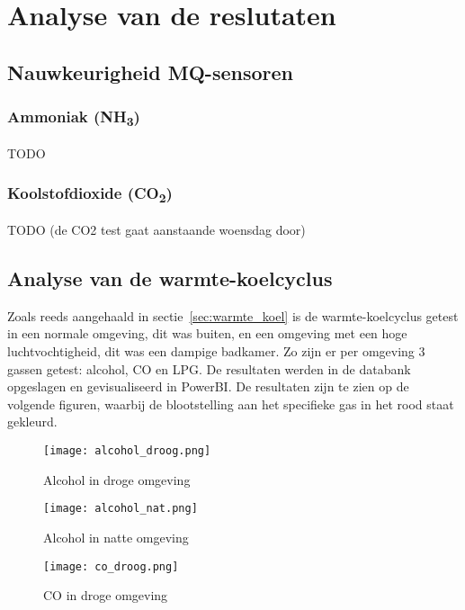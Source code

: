 \chapter{Analyse van de reslutaten}%
\label{ch:analyse}

\section{Nauwkeurigheid MQ-sensoren}
\label{sec:nauwkeurigheid}

\subsection{Ammoniak (NH\textsubscript{3})}
\label{subsec:nh3}

TODO


\subsection{Koolstofdioxide (CO\textsubscript{2})}
\label{subsec:co2}

TODO (de CO2 test gaat aanstaande woensdag door)

\section{Analyse van de warmte-koelcyclus}
\label{sec:analyse_mq7}

Zoals reeds aangehaald in sectie~\ref{sec:warmte_koel} is de warmte-koelcyclus getest in een normale omgeving, dit was buiten, en een omgeving met een hoge luchtvochtigheid, dit was een dampige badkamer. Zo zijn er per omgeving 3 gassen getest: alcohol, CO en LPG. De resultaten werden in de databank opgeslagen en gevisualiseerd in PowerBI. De resultaten zijn te zien op de volgende figuren, waarbij de blootstelling aan het specifieke gas in het rood staat gekleurd.

\begin{figure}[h!]
    \texttt{[image: alcohol\_droog.png]}
    \caption[Alcohol in droge omgeving]{Alcohol in droge omgeving}
    \label{fig:alcohol_droog}
\end{figure}

\begin{figure}[h!]
    \texttt{[image: alcohol\_nat.png]}
    \caption[Alcohol in natte omgeving]{Alcohol in natte omgeving}
    \label{fig:alcohol_nat}
\end{figure}

\begin{figure}[h!]
    \texttt{[image: co\_droog.png]}
    \caption[CO in droge omgeving]{CO in droge omgeving}
    \label{fig:co_droog}
\end{figure}

